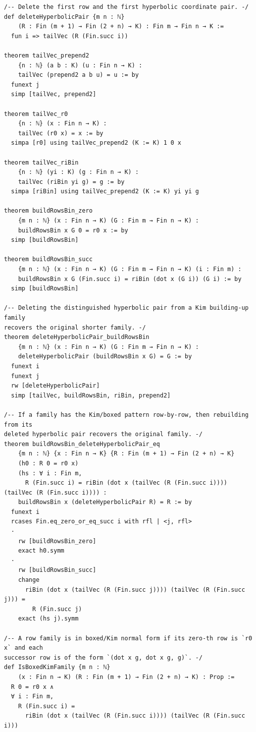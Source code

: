 \documentclass[12pt]{article}
\begin{document}
\begin{lstlisting}[caption={Lean verification for Theorem~\ref{thm:CZ_Kim_Lagrangian}.}]
/-- Delete the first row and the first hyperbolic coordinate pair. -/
def deleteHyperbolicPair {m n : ℕ}
    (R : Fin (m + 1) → Fin (2 + n) → K) : Fin m → Fin n → K :=
  fun i => tailVec (R (Fin.succ i))

theorem tailVec_prepend2
    {n : ℕ} (a b : K) (u : Fin n → K) :
    tailVec (prepend2 a b u) = u := by
  funext j
  simp [tailVec, prepend2]

theorem tailVec_r0
    {n : ℕ} (x : Fin n → K) :
    tailVec (r0 x) = x := by
  simpa [r0] using tailVec_prepend2 (K := K) 1 0 x

theorem tailVec_riBin
    {n : ℕ} (yi : K) (g : Fin n → K) :
    tailVec (riBin yi g) = g := by
  simpa [riBin] using tailVec_prepend2 (K := K) yi yi g

theorem buildRowsBin_zero
    {m n : ℕ} (x : Fin n → K) (G : Fin m → Fin n → K) :
    buildRowsBin x G 0 = r0 x := by
  simp [buildRowsBin]

theorem buildRowsBin_succ
    {m n : ℕ} (x : Fin n → K) (G : Fin m → Fin n → K) (i : Fin m) :
    buildRowsBin x G (Fin.succ i) = riBin (dot x (G i)) (G i) := by
  simp [buildRowsBin]

/-- Deleting the distinguished hyperbolic pair from a Kim building-up family
recovers the original shorter family. -/
theorem deleteHyperbolicPair_buildRowsBin
    {m n : ℕ} (x : Fin n → K) (G : Fin m → Fin n → K) :
    deleteHyperbolicPair (buildRowsBin x G) = G := by
  funext i
  funext j
  rw [deleteHyperbolicPair]
  simp [tailVec, buildRowsBin, riBin, prepend2]

/-- If a family has the Kim/boxed pattern row-by-row, then rebuilding from its
deleted hyperbolic pair recovers the original family. -/
theorem buildRowsBin_deleteHyperbolicPair_eq
    {m n : ℕ} {x : Fin n → K} {R : Fin (m + 1) → Fin (2 + n) → K}
    (h0 : R 0 = r0 x)
    (hs : ∀ i : Fin m,
      R (Fin.succ i) = riBin (dot x (tailVec (R (Fin.succ i)))) (tailVec (R (Fin.succ i)))) :
    buildRowsBin x (deleteHyperbolicPair R) = R := by
  funext i
  rcases Fin.eq_zero_or_eq_succ i with rfl | <j, rfl>
  ·
    rw [buildRowsBin_zero]
    exact h0.symm
  ·
    rw [buildRowsBin_succ]
    change
      riBin (dot x (tailVec (R (Fin.succ j)))) (tailVec (R (Fin.succ j))) =
        R (Fin.succ j)
    exact (hs j).symm

/-- A row family is in boxed/Kim normal form if its zero-th row is `r0 x` and each
successor row is of the form `(dot x g, dot x g, g)`. -/
def IsBoxedKimFamily {m n : ℕ}
    (x : Fin n → K) (R : Fin (m + 1) → Fin (2 + n) → K) : Prop :=
  R 0 = r0 x ∧
  ∀ i : Fin m,
    R (Fin.succ i) =
      riBin (dot x (tailVec (R (Fin.succ i)))) (tailVec (R (Fin.succ i)))


\end{lstlisting}
\end{document}
